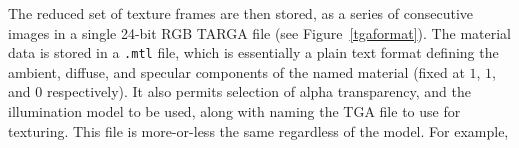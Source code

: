 \documentclass[a4paper,10pt]{article}
\begin{document}
\begin{itemize}
{The reduced set of texture frames are then stored, as a series of consecutive images in a single 24-bit RGB TARGA\cite{targa} file (see Figure~\ref{tgaformat}). The material data is stored in a \texttt{.mtl} file, which is essentially a plain text format defining the ambient, diffuse, and specular components of the named material (fixed at $1$, $1$, and $0$ respectively). It also permits selection of alpha transparency, and the illumination model to be used, along with naming the TGA file to use for texturing. This file is more-or-less the same regardless of the model. For example,

\noindent
\ttfamily
\hlstd{}\hspace*{\fill}\\
\hlstd{}\hlslc{\#}\hlstd{\ \ }\hspace*{\fill}\\
\hlstd{}\hlslc{\#}\hlstd{\ \ \ \ }\hspace*{\fill}\\
\hlstd{}\hlslc{\#}\hlstd{\ \ \ \ }\hspace*{\fill}\\
\hlstd{\ \ \ \ }\hlstd{\ \ }\hlnum{}\hlstd{}\hspace*{\fill}\\
\hlstd{}\hlstd{\ \ \ \ }\hlstd{\ \ }\hlnum{}\hlstd{}\hspace*{\fill}\\
\hlstd{}\hlstd{\ \ \ \ }\hlstd{\ \ }\hlnum{}\hlstd{}\hspace*{\fill}\\
\hlstd{\ \hspace*{\fill}\\
}\hlstd{\ \ \ \ }\hlstd{\ \ \ \ }\hlnum{}\hlstd{}\hspace*{\fill}\\
\hlstd{}\hlstd{\ \ \ \ }\hlstd{\ \ \ }\hlnum{}\hlstd{}\hlslc{\#}\hlstd{\ \ }\hspace*{\fill}\\
}
\end{itemize}
\end{document}

